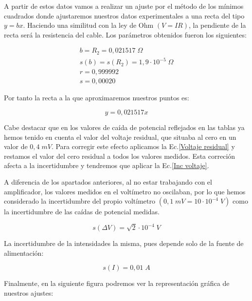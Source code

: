\documentclass[a4paper,12pt,titlepage]{report}
\begin{document}
A partir de estos datos vamos a realizar un ajuste por el método de los mínimos cuadrados donde ajustaremos nuestros datos experimentales a una recta del tipo $y=bx$. Haciendo una similitud con la ley de Ohm $(V=IR)$, la pendiente de la recta será la resistencia del cable. Los parámetros obtenidos fueron los siguientes:

\begin{equation}
    \begin{gathered}
        b = R_{2} =0,021517 \; \Omega 
        \\
        s(b) =s(R_{2})= 1,9 \cdot 10^{-5} \; \Omega
        \\
        r = 0,999992
        \\
        s = 0,00020
    \end{gathered}
\end{equation}

Por tanto la recta a la que aproximaremos nuestros puntos es:

\begin{equation}
    y = 0,021517x
\end{equation}

Cabe destacar que en los valores de caída de potencial reflejados en las tablas ya hemos tenido en cuenta el valor del voltaje residual, que situaba al cero en un valor de $0,4 \; mV$. Para corregir este efecto aplicamos la Ec.\ref{Voltaje residual} y restamos el valor del cero residual a todos los valores medidos. Esta correción afecta a la incertidumbre y tendremos que aplicar la Ec.\ref{Inc voltaje}.

\newpage

\par A diferencia de los apartados anteriores, al no estar trabajando con el amplificador, los valores medidos en el voltímetro no oscilaban, por lo que hemos considerado la incertidumbre del propio voltímetro $(0,1 \; mV=10 \cdot 10^{-4} \; V)$ como la incertidumbre de las caídas de potencial medidas.

\begin{equation}
    s(\Delta V) = \sqrt{2}\cdot 10^{-4} \; V
\end{equation}

La incertidumbre de la intensidades la misma, pues depende solo de la fuente de alimentación:

\begin{equation}
    s(I) = 0,01 \; A
\end{equation}

Finalmente, en la siguiente figura podremos ver la representación gráfica de nuestros ajustes:
\end{document}
